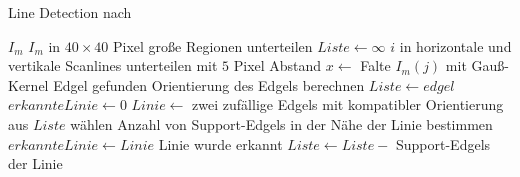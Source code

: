 \begin{algorithm}[ht]
\caption{Line Detection nach \citeauthor{clarke96}}
\label{alg:linedetection-clarke}
\begin{algorithmic}[1]
	\Require $I_m$
	\State $I_m$ in $40 \times 40$ Pixel große Regionen unterteilen
			\State $Liste \gets \infty$
			\State $i$ in horizontale und vertikale Scanlines unterteilen mit $5$ Pixel Abstand
				\State $x \gets$ Falte $I_m\left(j\right)$ mit Gauß-Kernel
					\Comment Edgel gefunden
					\State Orientierung des Edgels berechnen
					\State $Liste \gets edgel$
				\EndIf
			\EndFor
				\State $erkannteLinie \gets 0$
					\State $Linie \gets$ zwei zufällige Edgels mit kompatibler Orientierung aus $Liste$ wählen
					\State Anzahl von Support-Edgels in der Nähe der Linie bestimmen
						\State $erkannteLinie \gets Linie$
					\EndIf
				\EndFor
					\Comment Linie wurde erkannt
					\State $Liste \gets Liste -$ Support-Edgels der Linie
				\EndIf
			\EndWhile
		\EndFor
	\end{algorithmic}
\end{algorithm}

